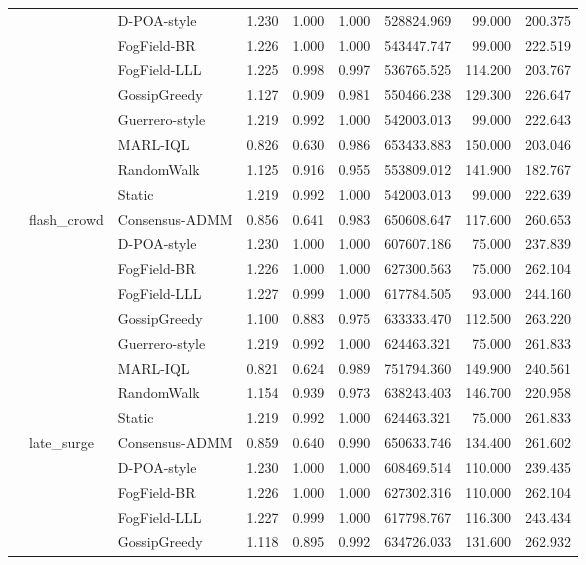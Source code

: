 \begin{table}
\begin{tabular}{lllrrrrrr}
 &  & D-POA-style & 1.230 & 1.000 & 1.000 & 528824.969 & 99.000 & 200.375 \\
 &  & FogField-BR & 1.226 & 1.000 & 1.000 & 543447.747 & 99.000 & 222.519 \\
 &  & FogField-LLL & 1.225 & 0.998 & 0.997 & 536765.525 & 114.200 & 203.767 \\
 &  & GossipGreedy & 1.127 & 0.909 & 0.981 & 550466.238 & 129.300 & 226.647 \\
 &  & Guerrero-style & 1.219 & 0.992 & 1.000 & 542003.013 & 99.000 & 222.643 \\
 &  & MARL-IQL & 0.826 & 0.630 & 0.986 & 653433.883 & 150.000 & 203.046 \\
 &  & RandomWalk & 1.125 & 0.916 & 0.955 & 553809.012 & 141.900 & 182.767 \\
 &  & Static & 1.219 & 0.992 & 1.000 & 542003.013 & 99.000 & 222.639 \\
\cline{2-9}
 & \multirow[t]{9}{*}{flash\_crowd} & Consensus-ADMM & 0.856 & 0.641 & 0.983 & 650608.647 & 117.600 & 260.653 \\
 &  & D-POA-style & 1.230 & 1.000 & 1.000 & 607607.186 & 75.000 & 237.839 \\
 &  & FogField-BR & 1.226 & 1.000 & 1.000 & 627300.563 & 75.000 & 262.104 \\
 &  & FogField-LLL & 1.227 & 0.999 & 1.000 & 617784.505 & 93.000 & 244.160 \\
 &  & GossipGreedy & 1.100 & 0.883 & 0.975 & 633333.470 & 112.500 & 263.220 \\
 &  & Guerrero-style & 1.219 & 0.992 & 1.000 & 624463.321 & 75.000 & 261.833 \\
 &  & MARL-IQL & 0.821 & 0.624 & 0.989 & 751794.360 & 149.900 & 240.561 \\
 &  & RandomWalk & 1.154 & 0.939 & 0.973 & 638243.403 & 146.700 & 220.958 \\
 &  & Static & 1.219 & 0.992 & 1.000 & 624463.321 & 75.000 & 261.833 \\
\cline{2-9}
 & \multirow[t]{9}{*}{late\_surge} & Consensus-ADMM & 0.859 & 0.640 & 0.990 & 650633.746 & 134.400 & 261.602 \\
 &  & D-POA-style & 1.230 & 1.000 & 1.000 & 608469.514 & 110.000 & 239.435 \\
 &  & FogField-BR & 1.226 & 1.000 & 1.000 & 627302.316 & 110.000 & 262.104 \\
 &  & FogField-LLL & 1.227 & 0.999 & 1.000 & 617798.767 & 116.300 & 243.434 \\
 &  & GossipGreedy & 1.118 & 0.895 & 0.992 & 634726.033 & 131.600 & 262.932 \\

\end{tabular}
\end{table}
